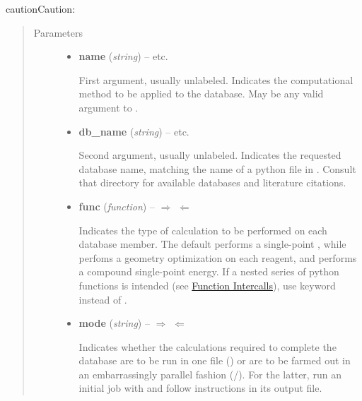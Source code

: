 \documentclass[letterpaper,10pt,english]{sphinxmanual}
\begin{document}
\begin{fulllineitems}
\begin{notice}{caution}{Caution:}
\begin{itemize}
\end{itemize}
\end{notice}
\begin{quote}\begin{description}
\item[{Parameters}] \leavevmode\begin{itemize}
\item {} 
\textbf{name} (\emph{string}) -- 
 \textbar{}\textbar{}  \textbar{}\textbar{}  \textbar{}\textbar{} etc.

First argument, usually unlabeled. Indicates the computational method
to be applied to the database. May be any valid argument to
{\hyperref[index:driver.energy]{}}.


\item {} 
\textbf{db\_name} (\emph{string}) -- 
 \textbar{}\textbar{}  \textbar{}\textbar{}  \textbar{}\textbar{} etc.

Second argument, usually unlabeled. Indicates the requested database
name, matching the name of a python file in .
Consult that directory for available databases and literature citations.


\item {} 
\textbf{func} (\emph{function}) -- 
$\Rightarrow$  $\Leftarrow$ \textbar{}\textbar{}  \textbar{}\textbar{} 

Indicates the type of calculation to be performed on each database
member. The default performs a single-point , while
 perfoms a geometry optimization on each reagent, and
 performs a compound single-point energy. If a nested series
of python functions is intended (see {\hyperref[index:function-intercalls]{Function Intercalls}}), use
keyword  instead of .


\item {} 
\textbf{mode} (\emph{string}) -- 
$\Rightarrow$  $\Leftarrow$ \textbar{}\textbar{}  \textbar{}\textbar{} 

Indicates whether the calculations required to complete the
database are to be run in one file () or are to be
farmed out in an embarrassingly parallel fashion
(/).  For the latter, run an initial job with
 and follow instructions in its output file.



\end{itemize}
\end{description}
\end{quote}
\end{fulllineitems}
\end{document}
